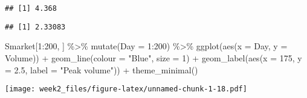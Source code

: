 \documentclass[
]{article}
\newenvironment{Shaded}{\begin{snugshade}}{\end{snugshade}}
\newcommand{\AttributeTok}[1]{\textcolor[rgb]{0.77,0.63,0.00}{#1}}
\newcommand{\DecValTok}[1]{\textcolor[rgb]{0.00,0.00,0.81}{#1}}
\newcommand{\FloatTok}[1]{\textcolor[rgb]{0.00,0.00,0.81}{#1}}
\newcommand{\FunctionTok}[1]{\textcolor[rgb]{0.00,0.00,0.00}{#1}}
\newcommand{\NormalTok}[1]{#1}
\newcommand{\SpecialCharTok}[1]{\textcolor[rgb]{0.00,0.00,0.00}{#1}}
\newcommand{\StringTok}[1]{\textcolor[rgb]{0.31,0.60,0.02}{#1}}
\begin{document}
\begin{Shaded}
\end{Shaded}

\begin{verbatim}
## [1] 4.368
\end{verbatim}

\begin{Shaded}
\end{Shaded}

\begin{verbatim}
## [1] 2.33083
\end{verbatim}

\begin{Shaded}
\begin{Highlighting}[]
\NormalTok{  Smarket[}\DecValTok{1}\SpecialCharTok{:}\DecValTok{200}\NormalTok{, ] }\SpecialCharTok{\%\textgreater{}\%}
    \FunctionTok{mutate}\NormalTok{(}\AttributeTok{Day =} \DecValTok{1}\SpecialCharTok{:}\DecValTok{200}\NormalTok{) }\SpecialCharTok{\%\textgreater{}\%}
    \FunctionTok{ggplot}\NormalTok{(}\FunctionTok{aes}\NormalTok{(}\AttributeTok{x =}\NormalTok{ Day, }\AttributeTok{y =}\NormalTok{ Volume)) }\SpecialCharTok{+} \FunctionTok{geom\_line}\NormalTok{(}\AttributeTok{colour =} \StringTok{"Blue"}\NormalTok{, }\AttributeTok{size =} \DecValTok{1}\NormalTok{) }\SpecialCharTok{+}
    \FunctionTok{geom\_label}\NormalTok{(}\FunctionTok{aes}\NormalTok{(}\AttributeTok{x =} \DecValTok{175}\NormalTok{, }\AttributeTok{y =} \FloatTok{2.5}\NormalTok{, }\AttributeTok{label =} \StringTok{"Peak volume"}\NormalTok{)) }\SpecialCharTok{+} \FunctionTok{theme\_minimal}\NormalTok{()}
\end{Highlighting}
\end{Shaded}

\texttt{[image: week2\_files/figure-latex/unnamed-chunk-1-18.pdf]}
\end{document}
